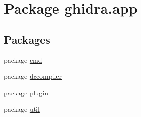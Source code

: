 \hypertarget{namespaceghidra_1_1app}{}\section{Package ghidra.\+app}
\label{namespaceghidra_1_1app}
\subsection*{Packages}
\begin{DoxyCompactItemize}
\item 
package \mbox{\hyperlink{namespaceghidra_1_1app_1_1cmd}{cmd}}
\item 
package \mbox{\hyperlink{namespaceghidra_1_1app_1_1decompiler}{decompiler}}
\item 
package \mbox{\hyperlink{namespaceghidra_1_1app_1_1plugin}{plugin}}
\item 
package \mbox{\hyperlink{namespaceghidra_1_1app_1_1util}{util}}
\end{DoxyCompactItemize}

